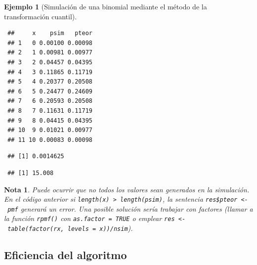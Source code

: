 \documentclass[
  spanish,
  10pt,
]{book}
\newenvironment{Shaded}{\begin{snugshade}}{\end{snugshade}}
\newcommand{\CommentTok}[1]{\textcolor[rgb]{0.56,0.35,0.01}{\textit{#1}}}
\newcommand{\DecValTok}[1]{\textcolor[rgb]{0.00,0.00,0.81}{#1}}
\newcommand{\FunctionTok}[1]{\textcolor[rgb]{0.13,0.29,0.53}{\textbf{#1}}}
\newcommand{\NormalTok}[1]{#1}
\newcommand{\SpecialCharTok}[1]{\textcolor[rgb]{0.81,0.36,0.00}{\textbf{#1}}}
\theoremstyle{break}
\newtheorem{example}{Ejemplo}[chapter]
\theoremstyle{nonumberplain}
\newtheorem{remark}{Nota}
\renewcommand{\CommentTok}[1]{\textcolor[rgb]{0.41,0.41,0.41}{\texttt{#1}}}
\begin{document}
\begin{example}[Simulación de una binomial mediante el método de la transformación cuantil]
\begin{verbatim}
 ##     x    psim   pteor
 ## 1   0 0.00100 0.00098
 ## 2   1 0.00981 0.00977
 ## 3   2 0.04457 0.04395
 ## 4   3 0.11865 0.11719
 ## 5   4 0.20377 0.20508
 ## 6   5 0.24477 0.24609
 ## 7   6 0.20593 0.20508
 ## 8   7 0.11631 0.11719
 ## 9   8 0.04415 0.04395
 ## 10  9 0.01021 0.00977
 ## 11 10 0.00083 0.00098
\end{verbatim}

\begin{Shaded}
\end{Shaded}

\begin{verbatim}
 ## [1] 0.0014625
\end{verbatim}

\begin{Shaded}
\end{Shaded}

\begin{verbatim}
 ## [1] 15.008
\end{verbatim}

\end{example}

\begin{remark}
Puede ocurrir que no todos los valores sean generados en la simulación.
En el código anterior si \texttt{length(x)\ \textgreater{}\ length(psim)}, la sentencia \texttt{res\$pteor\ \textless{}-\ pmf} generará un error.
Una posible solución sería trabajar con factores (llamar a la función \texttt{rpmf()} con \texttt{as.factor\ =\ TRUE} o emplear \texttt{res\ \textless{}-\ table(factor(rx,\ levels\ =\ x))/nsim}).
\end{remark}

\subsection{Eficiencia del algoritmo}\label{eficiencia-del-algoritmo-1}
\end{document}
